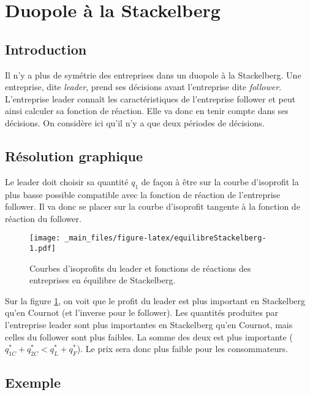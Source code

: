 \documentclass[
]{book}
\theoremstyle{definition}
\theoremstyle{definition}
\theoremstyle{definition}
\theoremstyle{definition}
\theoremstyle{remark}
\begin{document}
\hypertarget{duopole-uxe0-la-stackelberg}{%
\section{Duopole à la Stackelberg}\label{duopole-uxe0-la-stackelberg}}

\hypertarget{introduction-1}{%
\subsection{Introduction}\label{introduction-1}}

Il n'y a plus de symétrie des entreprises dans un duopole à la Stackelberg.
Une entreprise, dite \emph{leader}, prend ses décisions avant l'entreprise dite \emph{follower}.
L'entreprise leader connaît les caractéristiques de l'entreprise follower et peut ainsi calculer sa fonction de réaction.
Elle va donc en tenir compte dans ses décisions.
On considère ici qu'il n'y a que deux périodes de décisions.

\hypertarget{ruxe9solution-graphique}{%
\subsection{Résolution graphique}\label{ruxe9solution-graphique}}

Le leader doit choisir sa quantité \(q_1\) de façon à être sur la courbe d'isoprofit la plus basse possible compatible avec la fonction de réaction de l'entreprise follower.
Il va donc se placer sur la courbe d'isoprofit tangente à la fonction de réaction du follower.

\begin{figure}
\centering
\texttt{[image: \_main\_files/figure-latex/equilibreStackelberg-1.pdf]}
\caption{\label{fig:equilibreStackelberg}Courbes d'isoprofits du leader et fonctions de réactions des entreprises en équilibre de Stackelberg.}
\end{figure}

Sur la figure \ref{fig:equilibreStackelberg}, on voit que le profit du leader est plus important en Stackelberg qu'en Cournot (et l'inverse pour le follower).
Les quantités produites par l'entreprise leader sont plus importantes en Stackelberg qu'en Cournot, mais celles du follower sont plus faibles.
La somme des deux est plus importante (\(q_{1C}^*+q_{2C}^*<q_{L}^*+q_{F}^*\)).
Le prix sera donc plus faible pour les consommateurs.

\hypertarget{exemple-1}{%
\subsection{Exemple}\label{exemple-1}}
\end{document}
